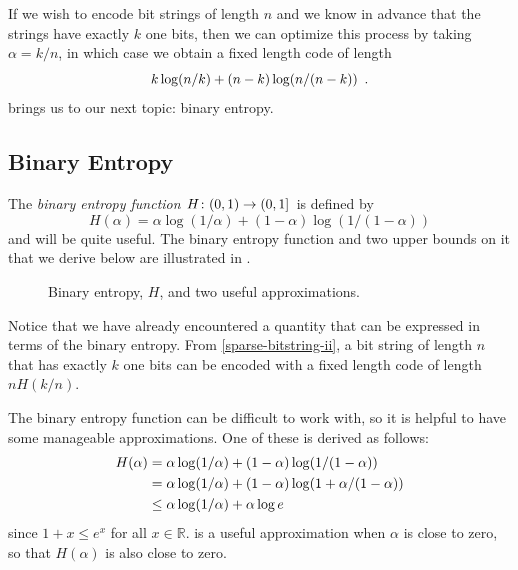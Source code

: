 \documentclass{patmorin}
\begin{document}
If we wish to encode bit strings of length $n$ and we know in advance
that the strings have exactly $k$ one bits, then we can optimize this
process by taking $\alpha=k/n$, in which case we obtain a fixed length
code of length
\begin{equation}
  k\log (n/k) + (n-k)\log(n/(n-k))  \eqlabel{sparse-bitstring-ii} \enspace .
\end{equation}
 brings us to our next topic: binary entropy.

\subsection{Binary Entropy}

The \emph{binary entropy function} $H\colon (0,1)\to(0,1]$ is defined
by
\[
  H(\alpha) = \alpha\log(1/\alpha) + (1-\alpha)\log(1/(1-\alpha)) 
\]
and will be quite useful.  The binary entropy function and two upper
bounds on it that we derive below are illustrated in .

\begin{figure}
  \caption{Binary entropy, $H$, and two useful approximations.}
\end{figure}

Notice that we have already encountered a quantity that can be
expressed in terms of the binary entropy.  From
\eqref{sparse-bitstring-ii}, a bit string of length $n$ that has
exactly $k$ one bits can be encoded with a fixed length code of length
$nH(k/n)$.

The binary entropy function can be difficult to work with, so it is
helpful to have some manageable approximations.  One of these is
derived as follows:
\begin{align}
  H(\alpha) & = \alpha\log(1/\alpha) + (1-\alpha)\log(1/(1-\alpha)) \notag \\
            & = \alpha\log(1/\alpha) + (1-\alpha)\log(1+\alpha/(1-\alpha)) \notag \\
            & \le \alpha\log(1/\alpha) + \alpha\log e \eqlabel{entropy-i} 
\end{align}
since $1+x\le e^x$ for all $x\in\mathbb{R}$.  is a
useful approximation when $\alpha$ is close to zero, so that
$H(\alpha)$ is also close to zero.
\end{document}
